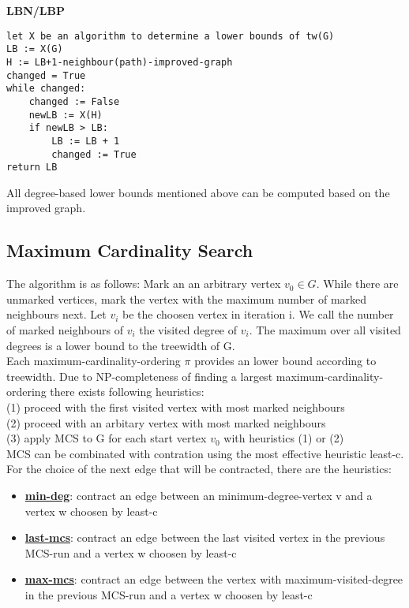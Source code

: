 \documentclass[a4wide]{article}
\begin{document}
\vspace*{0.5cm}

\textbf{LBN/LBP}
\begin{lstlisting}[mathescape]
let X be an algorithm to determine a lower bounds of tw(G)
LB := X(G)
H := LB+1-neighbour(path)-improved-graph
changed = True
while changed:
    changed := False
    newLB := X(H)
    if newLB > LB:
        LB := LB + 1
        changed := True
return LB
\end{lstlisting}

\vspace*{5mm}

All degree-based lower bounds mentioned above can be computed based on the improved graph.

\newpage

\subsection{Maximum Cardinality Search}

The algorithm is as follows: Mark an an arbitrary vertex $v_{0} \in G$. While there are unmarked vertices, mark the vertex with the maximum number of marked neighbours next. Let $v_{i}$ be the choosen vertex in iteration i. We call the number of marked neighbours of $v_{i}$ the visited degree of $v_{i}$. The maximum over all visited degrees is a lower bound to the treewidth of G. \\

Each maximum-cardinality-ordering $\pi$ provides an lower bound according to treewidth. Due to NP-completeness of finding a largest maximum-cardinality-ordering there exists following heuristics: \\
(1) proceed with the first visited vertex with most marked neighbours \\
(2) proceed with an arbitary vertex with most marked neighbours \\
(3) apply MCS to G for each start vertex $v_{0}$ with heuristics (1) or (2) \\ 

MCS can be combinated with contration using the most effective heuristic least-c. For  the choice of the next edge that will be contracted, there are the heuristics:
\begin{itemize}
\item \underline{\textbf{min-deg}}:  contract an edge between an minimum-degree-vertex v and a vertex w choosen by least-c 
\item \underline{\textbf{last-mcs}}: contract an edge between the last visited vertex in the previous MCS-run and a vertex w choosen by least-c 
\item \underline{\textbf{max-mcs}}: contract an edge between the vertex with maximum-visited-degree in the previous MCS-run and a vertex w choosen by least-c
\end{itemize}
\end{document}
